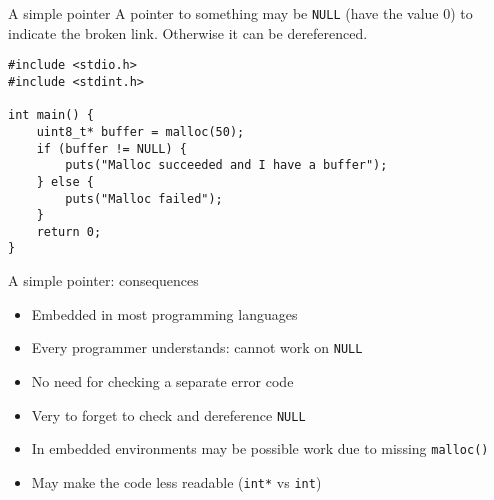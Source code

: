 \documentclass[aspectratio=169,14pt]{beamer}
\begin{document}
\begin{frame}[fragile]{A simple pointer}
A pointer to something may be \texttt{NULL} (have the value 0) to indicate the broken link. Otherwise it can be dereferenced.

\begin{lstlisting}[style=cstyle]
#include <stdio.h>
#include <stdint.h>

int main() {
    uint8_t* buffer = malloc(50);
    if (buffer != NULL) {
        puts("Malloc succeeded and I have a buffer");
    } else {
        puts("Malloc failed");
    }
    return 0;
}
\end{lstlisting}
\end{frame}



\begin{frame}[fragile]{A simple pointer: consequences}
\begin{itemize}
    \item[\good] Embedded in most programming languages
    \item[\good] Every programmer understands: cannot work on \texttt{NULL}
    \item[\good] No need for checking a separate error code
    \item[\bad] Very to forget to check and dereference \texttt{NULL}
    \item[\meh] In embedded environments may be possible work due to missing \texttt{malloc()}
    \item[\meh] May make the code less readable (\texttt{int*} vs \texttt{int})
\end{itemize}
\end{frame}
\end{document}

